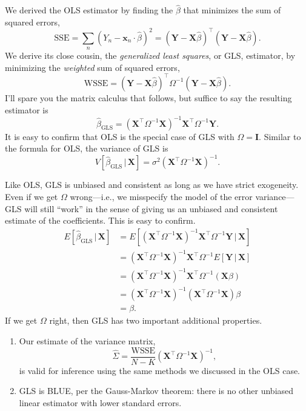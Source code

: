 \documentclass[
  12pt,
  oneside,openany]{book}
\begin{document}
We derived the OLS estimator by finding the \(\hat{\beta}\) that minimizes the sum of squared errors,
\[
\text{SSE}
= \sum_n (Y_n - \mathbf{x}_n \cdot \hat{\beta})^2
= (\mathbf{Y} - \mathbf{X} \hat{\beta})^\top (\mathbf{Y} - \mathbf{X} \hat{\beta}).
\]
We derive its close cousin, the \emph{generalized least squares}, or GLS, estimator, by minimizing the \emph{weighted} sum of squared errors,
\[
\text{WSSE} = (\mathbf{Y} - \mathbf{X} \hat{\beta})^\top \Omega^{-1} (\mathbf{Y} - \mathbf{X} \hat{\beta}).
\]
I'll spare you the matrix calculus that follows, but suffice to say the resulting estimator is
\[
\hat{\beta}_{\text{GLS}} = (\mathbf{X}^\top \Omega^{-1} \mathbf{X})^{-1} \mathbf{X}^\top \Omega^{-1} \mathbf{Y}.
\]
It is easy to confirm that OLS is the special case of GLS with \(\Omega = \mathbf{I}\). Similar to the formula for OLS, the variance of GLS is
\[
V[\hat{\beta}_{\text{GLS}} \,|\, \mathbf{X}] = \sigma^2 (\mathbf{X}^\top \Omega^{-1} \mathbf{X})^{-1}.
\]

Like OLS, GLS is unbiased and consistent as long as we have strict exogeneity. Even if we get \(\Omega\) wrong---i.e., we misspecify the model of the error variance---GLS will still ``work'' in the sense of giving us an unbiased and consistent estimate of the coefficients. This is easy to confirm.
\[
\begin{aligned}
E [ \hat{\beta}_{\text{GLS}} \,|\, \mathbf{X} ]
&= E [ (\mathbf{X}^\top \Omega^{-1} \mathbf{X})^{-1} \mathbf{X}^\top \Omega^{-1} \mathbf{Y} \,|\, \mathbf{X} ] \\
&= (\mathbf{X}^\top \Omega^{-1} \mathbf{X})^{-1} \mathbf{X}^\top \Omega^{-1} E [\mathbf{Y} \,|\, \mathbf{X} ] \\
&= (\mathbf{X}^\top \Omega^{-1} \mathbf{X})^{-1} \mathbf{X}^\top \Omega^{-1} (\mathbf{X} \beta) \\
&= (\mathbf{X}^\top \Omega^{-1} \mathbf{X})^{-1} (\mathbf{X}^\top \Omega^{-1} \mathbf{X}) \beta \\
&= \beta.
\end{aligned}
\]
If we get \(\Omega\) right, then GLS has two important additional properties.

\begin{enumerate}
\def\labelenumi{\arabic{enumi}.}
\item
  Our estimate of the variance matrix,
  \[
  \hat{\Sigma} = \frac{\text{WSSE}}{N - K} (\mathbf{X}^\top \Omega^{-1} \mathbf{X})^{-1},
  \]
  is valid for inference using the same methods we discussed in the OLS case.
\item
  GLS is BLUE, per the Gauss-Markov theorem: there is no other unbiased linear estimator with lower standard errors.
\end{enumerate}
\end{document}
